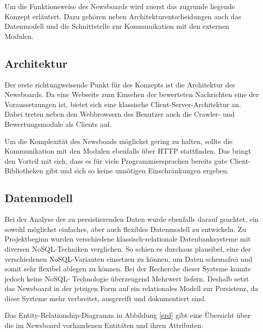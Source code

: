 Um die Funktionsweise des Newsboards wird zuerst das zugrunde liegende Konzept erläutert.
Dazu gehören neben Architekturentscheidungen auch das Datenmodell und die Schnittstelle
zur Kommunikation mit den externen Modulen.

\subsection{Architektur}
Der erste richtungweisende Punkt für des Konzepts ist die Architektur des Newsboards.
Da eine Webseite zum Einsehen der bewerteten Nachrichten eine der Voraussetzungen ist,
bietet sich eine klassische Client-Server-Architektur an.
Dabei treten neben den Webbrowsern des Benutzer auch die Crawler-
und Bewertungsmodule als Clients auf.

Um die Komplexität des Newsboads möglichst gering zu halten, sollte die Kommunikation
mit den Modulen ebenfalls über HTTP stattfinden. Das bringt den Vorteil mit sich,
dass es für viele Programmiersprachen bereits gute Client-Bibliotheken gibt
und sich so keine unnötigen Einschränkungen ergeben.

\subsection{Datenmodell}
Bei der Analyse der zu persistierenden Daten wurde ebenfalls darauf geachtet, ein
sowohl möglichst einfaches, aber auch flexibles Datenmodell zu entwickeln. Zu Projektbeginn wurden verschiedene klassisch-relationale Datenbanksysteme mit diversen 
NoSQL-Techniken verglichen. So schien es durchaus plausibel, eine der verschiedenen
NoSQL-Varianten einsetzen zu können, um Daten schemafrei und somit sehr flexibel 
ablegen zu können. Bei der Recherche dieser Systeme konnte jedoch keine NoSQL-
Technologie überzeugend Mehrwert liefern. Deshalb setzt das Newsboard in der jetzigen Form 
auf ein relationales Modell zur Persistenz, da diese Systeme mehr
verbreitet, ausgereift und dokumentiert sind.

Das Entity-Relationship-Diagramm in Abbildung \ref{erd} gibt eine Übersicht über die im Newsboard
vorhandenen Entitäten und ihren Attributen.

